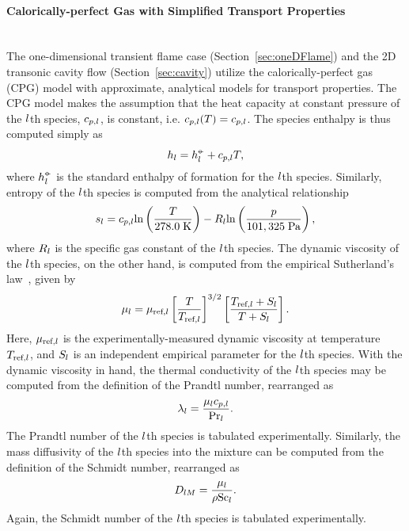 \paragraph*{Calorically-perfect Gas with Simplified Transport Properties}\mbox{}\\
%
The one-dimensional transient flame case (Section~\ref{sec:oneDFlame}) and the 2D transonic cavity flow (Section~\ref{sec:cavity}) utilize the calorically-perfect gas (CPG) model with approximate, analytical models for transport properties. The CPG model makes the assumption that the heat capacity at constant pressure of the $l$th species, $c_{p,l}$, is constant, i.e. $c_{p,l}(T) = c_{p,l}$. The species enthalpy is thus computed simply as
%
\begin{equation}\label{eq:cpgEnthSpec}
	h_{l} = h^{\circ\kern-0.47em-}_{l} + c_{p,l} T,
\end{equation}
%
where $h^{\circ\kern-0.47em-}_{l}$ is the standard enthalpy of formation for the $l$th species. Similarly, entropy of the $l$th species is computed from the analytical relationship
%
\begin{equation}\label{eq:cpgEntropySpec}
	s_{l} = c_{p,l} \text{ln}\left(\frac{T}{278.0 \; \text{K}}\right) - R_{l} \text{ln}\left(\frac{p}{101,325 \; \text{Pa}}\right),
\end{equation}
%
where $R_{l}$ is the specific gas constant of the $l$th species. The dynamic viscosity of the $l$th species, on the other hand, is computed from the empirical Sutherland's law~\cite{Sutherland1893}, given by
%
\begin{equation}\label{eq:viscSuthSpec}
	\mu_{l} = \mu_{\text{ref},l} \left[ \frac{T}{T_{\text{ref},l}} \right]^{3/2} \left[ \frac{T_{\text{ref},l} + S_{l}}{T + S_{l}} \right].
\end{equation}
%
Here, $\mu_{\text{ref},l}$ is the experimentally-measured dynamic viscosity at temperature $T_{\text{ref},l}$, and $S_{l}$ is an independent empirical parameter for the $l$th species. With the dynamic viscosity in hand, the thermal conductivity of the $l$th species may be computed from the definition of the Prandtl number, rearranged as
%
\begin{equation}\label{eq:cpgThermCondSpec}
	\lambda_{l} = \frac{\mu_{l} c_{p,l}}{\text{Pr}_{l}}.
\end{equation}
%
The Prandtl number of the $l$th species is tabulated experimentally. Similarly, the mass diffusivity of the $l$th species into the mixture can be computed from the definition of the Schmidt number, rearranged as
%
\begin{equation}\label{eq:cpgMassDiffSpec}
	D_{l M} = \frac{\mu_{l}}{\rho \text{Sc}_{l}}.
\end{equation}
%
Again, the Schmidt number of the $l$th species is tabulated experimentally.

